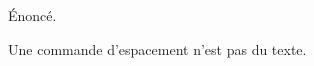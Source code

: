 \begin{theorem}
  Énoncé.
\end{theorem} %
\medskip
\begin{proposition}
  Une commande d'espacement n'est pas du texte.
\end{proposition}
